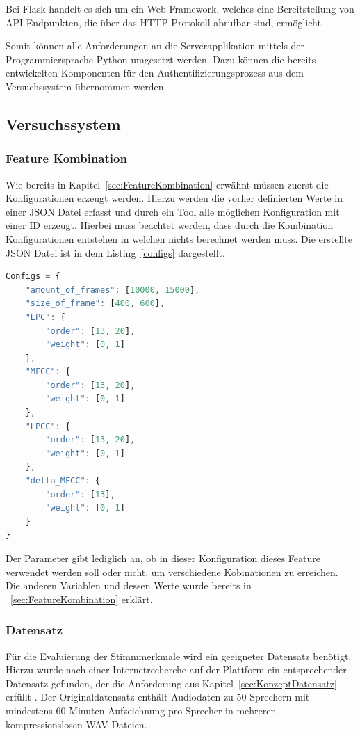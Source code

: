 Bei Flask handelt es sich um ein Web Framework, welches eine Bereitstellung von \ac{API} Endpunkten, die über das \ac{HTTP} Protokoll abrufbar sind, ermöglicht.

Somit können alle Anforderungen an die Serverapplikation mittels der Programmiersprache Python umgesetzt werden.
Dazu können die bereits entwickelten Komponenten für den Authentifizierungsprozess aus dem Versuchssystem übernommen werden.

\subsection{Versuchssystem}

\subsubsection{Feature Kombination}
Wie bereits in Kapitel~\ref{sec:FeatureKombination} erwähnt müssen zuerst die Konfigurationen erzeugt werden.
Hierzu werden die vorher definierten Werte in einer JSON Datei erfasst und durch ein Tool alle möglichen Konfiguration mit einer ID erzeugt.
Hierbei muss beachtet werden, dass durch die Kombination Konfigurationen entstehen in welchen nichts berechnet werden muss.
Die erstellte JSON Datei ist in dem Listing~\ref{configs} dargestellt.
\begin{lstlisting}[language=JavaScript,numbers=none,caption=Konfigurationsmöglichkeiten,label=configs]
Configs = {
    "amount_of_frames": [10000, 15000],
    "size_of_frame": [400, 600],
    "LPC": {
        "order": [13, 20],
        "weight": [0, 1]
    },
    "MFCC": {
        "order": [13, 20],
        "weight": [0, 1]
    },
    "LPCC": {
        "order": [13, 20],
        "weight": [0, 1]
    },
    "delta_MFCC": {
        "order": [13],
        "weight": [0, 1]
    }
}
\end{lstlisting}
Der  Parameter gibt lediglich an, ob in dieser Konfiguration dieses Feature verwendet werden soll oder nicht, um verschiedene Kobinationen zu erreichen.
Die anderen Variablen und dessen Werte wurde bereits in ~\ref{sec:FeatureKombination} erklärt.

\subsubsection{Datensatz}
Für die Evaluierung der Stimmmerkmale wird ein geeigneter Datensatz benötigt.
Hierzu wurde nach einer Internetrecherche auf der Plattform  ein entsprechender Datensatz gefunden, der die Anforderung aus Kapitel~\ref{sec:KonzeptDatensatz} erfüllt \autocite[vgl.][]{jain_speaker_2019}. 
Der Originaldatensatz enthält Audiodaten zu 50 Sprechern mit mindestens 60 Minuten Aufzeichnung pro Sprecher in mehreren kompressionslosen WAV Dateien.

